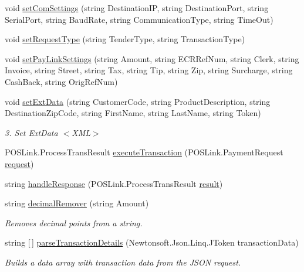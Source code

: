 \begin{DoxyCompactItemize}
void \mbox{\hyperlink{class_cert_complete_1_1_p_a_x_device_a1a237ea9b4ed7954011c7fea25a2d067}{set\+Com\+Settings}} (string Destination\+IP, string Destination\+Port, string Serial\+Port, string Baud\+Rate, string Communication\+Type, string Time\+Out)
\item 
void \mbox{\hyperlink{class_cert_complete_1_1_p_a_x_device_a9c1158002efaafb7bbab49c98273964d}{set\+Request\+Type}} (string Tender\+Type, string Transaction\+Type)
\item 
void \mbox{\hyperlink{class_cert_complete_1_1_p_a_x_device_a6c71f48ffd9e8fed9d65366467238fd6}{set\+Pay\+Link\+Settings}} (string Amount, string E\+C\+R\+Ref\+Num, string Clerk, string Invoice, string Street, string Tax, string Tip, string Zip, string Surcharge, string Cash\+Back, string Orig\+Ref\+Num)
\item 
void \mbox{\hyperlink{class_cert_complete_1_1_p_a_x_device_a3251f2ea687cab2567bfb4a24ec50aa8}{set\+Ext\+Data}} (string Customer\+Code, string Product\+Description, string Destination\+Zip\+Code, string First\+Name, string Last\+Name, string Token)
\begin{DoxyCompactList}\small\item\em 3. Set Ext\+Data $<$\+X\+M\+L$>$ \end{DoxyCompactList}\item 
P\+O\+S\+Link.\+Process\+Trans\+Result \mbox{\hyperlink{class_cert_complete_1_1_p_a_x_device_a28711bc71dba66a4a6abf24e09941cbe}{execute\+Transaction}} (P\+O\+S\+Link.\+Payment\+Request \mbox{\hyperlink{class_cert_complete_1_1_p_a_x_device_a101e6e34494845a82d2834c79fce5554}{request}})
\item 
string \mbox{\hyperlink{class_cert_complete_1_1_p_a_x_device_a3869b5b02f12f7369468fcd0e3353700}{handle\+Response}} (P\+O\+S\+Link.\+Process\+Trans\+Result \mbox{\hyperlink{class_cert_complete_1_1_p_a_x_device_a71de9bbbc884a048ba0a7c99a423325c}{result}})
\item 
string \mbox{\hyperlink{class_cert_complete_1_1_p_a_x_device_a18d132a18ea2c19154be3c762b7b4342}{decimal\+Remover}} (string Amount)
\begin{DoxyCompactList}\small\item\em Removes decimal points from a string. \end{DoxyCompactList}\item 
string \mbox{[}$\,$\mbox{]} \mbox{\hyperlink{class_cert_complete_1_1_p_a_x_device_ac404eca26b52ca9becaba9d29594e09a}{parse\+Transaction\+Details}} (Newtonsoft.\+Json.\+Linq.\+J\+Token transaction\+Data)
\begin{DoxyCompactList}\small\item\em Builds a data array with transaction data from the J\+S\+ON request. \end{DoxyCompactList}\end{DoxyCompactItemize}
